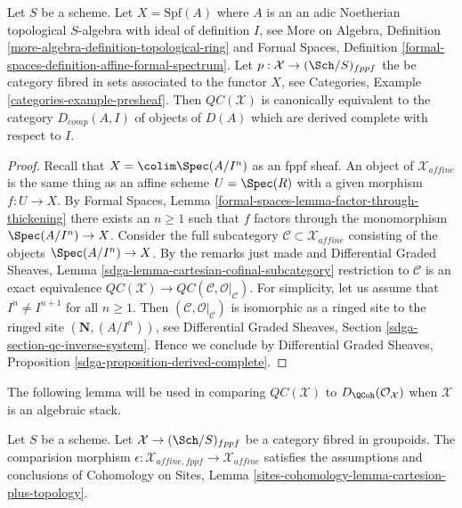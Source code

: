 \begin{proposition}
\label{proposition-QC-derived-complete}
Let $S$ be a scheme. Let $X = \text{Spf}(A)$ where $A$ is an
an adic Noetherian topological $S$-algebra with ideal of definition $I$, see
More on Algebra, Definition \ref{more-algebra-definition-topological-ring}
and Formal Spaces, Definition
\ref{formal-spaces-definition-affine-formal-spectrum}.
Let $p : \mathcal{X} \to (\Sch/S)_{fppf}$
the be category fibred in sets associated to the functor $X$, see
Categories, Example \ref{categories-example-presheaf}.
Then $\mathit{QC}(\mathcal{X})$ is canonically equivalent to the
category $D_{comp}(A, I)$ of objects of $D(A)$ which are
derived complete with respect to $I$.
\end{proposition}

\begin{proof}
Recall that $X = \colim \Spec(A/I^n)$ as an fppf sheaf.
An object of $\mathcal{X}_{affine}$ is the same thing
as an affine scheme $U = \Spec(R)$ with a given morphism $f : U \to X$.
By Formal Spaces, Lemma \ref{formal-spaces-lemma-factor-through-thickening}
there exists an $n \geq 1$ such that
$f$ factors through the monomorphism $\Spec(A/I^n) \to X$.
Consider the full subcategory
$\mathcal{C} \subset \mathcal{X}_{affine}$ consisting of
the objects $\Spec(A/I^n) \to X$.
By the remarks just made and Differential Graded Sheaves, Lemma
\ref{sdga-lemma-cartesian-cofinal-subcategory}
restriction to $\mathcal{C}$ is an exact equivalence
$\mathit{QC}(\mathcal{X}) \to
\mathit{QC}(\mathcal{C}, \mathcal{O}|_\mathcal{C})$.
For simplicity, let us assume that
$I^n \not = I^{n + 1}$ for all $n \geq 1$.
Then $(\mathcal{C}, \mathcal{O}|_\mathcal{C})$ is isomorphic 
as a ringed site to the ringed site $(\mathbf{N}, (A/I^n))$, see
Differential Graded Sheaves, Section
\ref{sdga-section-qc-inverse-system}.
Hence we conclude by Differential Graded Sheaves, Proposition
\ref{sdga-proposition-derived-complete}.
\end{proof}

\noindent
The following lemma will be used in comparing $\mathit{QC}(\mathcal{X})$
to $D_\QCoh(\mathcal{O}_\mathcal{X})$ when $\mathcal{X}$ is an algebraic stack.

\begin{lemma}
\label{lemma-QC-compare-fppf}
Let $S$ be a scheme. Let $\mathcal{X} \to (\Sch/S)_{fppf}$ be a category
fibred in groupoids. The comparision morphism
$\epsilon : \mathcal{X}_{affine, fppf} \to \mathcal{X}_{affine}$
satisfies the assumptions and conclusions of Cohomology on Sites, Lemma
\ref{sites-cohomology-lemma-cartesion-plus-topology}.
\end{lemma}


